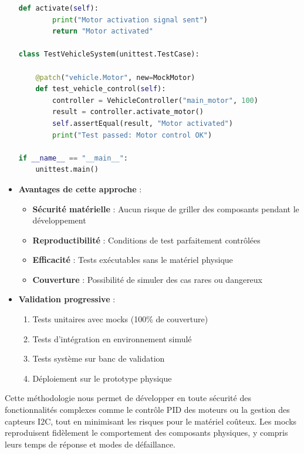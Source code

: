 \documentclass[a4paper, 12pt]{article}
\begin{document}
\begin{itemize}
\begin{lstlisting}[language=Python]
	def activate(self):
		print("Motor activation signal sent")
		return "Motor activated"

class TestVehicleSystem(unittest.TestCase):

	@patch("vehicle.Motor", new=MockMotor)
	def test_vehicle_control(self):
		controller = VehicleController("main_motor", 100)
		result = controller.activate_motor()
		self.assertEqual(result, "Motor activated")
		print("Test passed: Motor control OK")

if __name__ == "__main__":
	unittest.main()
		\end{lstlisting}
		
		\item \textbf{Avantages de cette approche} :
		\begin{itemize}
			\item \textbf{Sécurité matérielle} : Aucun risque de griller des composants pendant le développement
			\item \textbf{Reproductibilité} : Conditions de test parfaitement contrôlées
			\item \textbf{Efficacité} : Tests exécutables sans le matériel physique
			\item \textbf{Couverture} : Possibilité de simuler des cas rares ou dangereux
		\end{itemize}
		
		\item \textbf{Validation progressive} :
		\begin{enumerate}
			\item Tests unitaires avec mocks (100\% de couverture)
			\item Tests d'intégration en environnement simulé
			\item Tests système sur banc de validation
			\item Déploiement sur le prototype physique
		\end{enumerate}
	\end{itemize}
	
	Cette méthodologie nous permet de développer en toute sécurité des fonctionnalités complexes comme le contrôle PID des moteurs ou la gestion des capteurs I2C, tout en minimisant les risques pour le matériel coûteux. Les mocks reproduisent fidèlement le comportement des composants physiques, y compris leurs temps de réponse et modes de défaillance.
	
\end{document}
